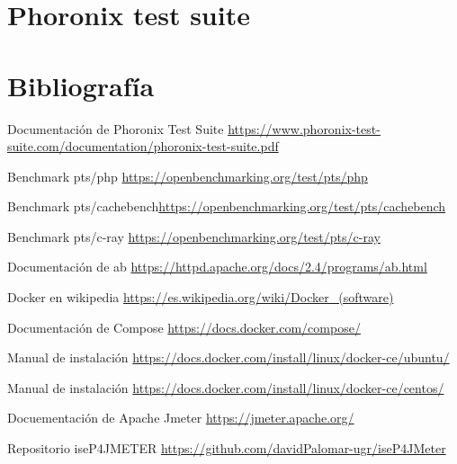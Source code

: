 \documentclass[12pt, spanish]{article}
\begin{document}
\pagebreak

\tableofcontents
\pagebreak

\section{Phoronix test suite}


\section{Bibliografía}
\begin{thebibliography}{1}

Documentación de Phoronix Test Suite \url{https://www.phoronix-test-suite.com/documentation/phoronix-test-suite.pdf}

Benchmark pts/php \url{https://openbenchmarking.org/test/pts/php}

Benchmark pts/cachebench\url{https://openbenchmarking.org/test/pts/cachebench}

Benchmark pts/c-ray \url{https://openbenchmarking.org/test/pts/c-ray}

Documentación de ab \url{https://httpd.apache.org/docs/2.4/programs/ab.html}

Docker en wikipedia \url{https://es.wikipedia.org/wiki/Docker_(software)}

Documentación de Compose \url{https://docs.docker.com/compose/}

Manual de instalación \url{https://docs.docker.com/install/linux/docker-ce/ubuntu/}

Manual de instalación \url{https://docs.docker.com/install/linux/docker-ce/centos/}

Docuementación de Apache Jmeter \url{https://jmeter.apache.org/}

Repositorio iseP4JMETER \url{https://github.com/davidPalomar-ugr/iseP4JMeter}



\end{thebibliography}
\end{document}

